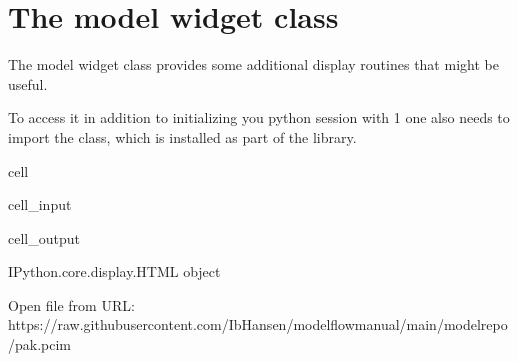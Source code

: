 \documentclass[letterpaper,10pt,english]{jupyterBook}
\begin{document}
\chapter{The model widget class}
\label{\detokenize{content/07_MoreFeatures/modelwidgets:the-model-widget-class}}\label{\detokenize{content/07_MoreFeatures/modelwidgets::doc}}
\sphinxAtStartPar
The model widget class provides some additional display routines that might be useful.

\sphinxAtStartPar
To access it in addition to initializing you python session with 1 one also needs to import the  class, which is installed as part of the  library.

\begin{sphinxuseclass}{cell}\begin{sphinxVerbatimInput}

\begin{sphinxuseclass}{cell_input}
\begin{sphinxVerbatim}[commandchars=\\\{\}]
   
    
     

  
\end{sphinxVerbatim}

\end{sphinxuseclass}\end{sphinxVerbatimInput}
\begin{sphinxVerbatimOutput}

\begin{sphinxuseclass}{cell_output}
\begin{sphinxVerbatim}[commandchars=\\\{\}]
\PYGZlt{}IPython.core.display.HTML object\PYGZgt{}
\end{sphinxVerbatim}

\begin{sphinxVerbatim}[commandchars=\\\{\}]
Open file from URL:  https://raw.githubusercontent.com/IbHansen/modelflow\PYGZhy{}manual/main/model\PYGZus{}repo/pak.pcim
\end{sphinxVerbatim}

\end{sphinxuseclass}\end{sphinxVerbatimOutput}

\end{sphinxuseclass}
\end{document}
